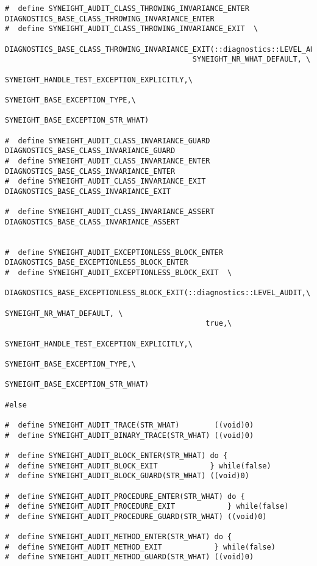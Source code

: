 \begin{verbatim}
#  define SYNEIGHT_AUDIT_CLASS_THROWING_INVARIANCE_ENTER DIAGNOSTICS_BASE_CLASS_THROWING_INVARIANCE_ENTER
#  define SYNEIGHT_AUDIT_CLASS_THROWING_INVARIANCE_EXIT  \
    DIAGNOSTICS_BASE_CLASS_THROWING_INVARIANCE_EXIT(::diagnostics::LEVEL_AUDIT,\
                                           SYNEIGHT_NR_WHAT_DEFAULT, \
                                           SYNEIGHT_HANDLE_TEST_EXCEPTION_EXPLICITLY,\
                                           SYNEIGHT_BASE_EXCEPTION_TYPE,\
                                           SYNEIGHT_BASE_EXCEPTION_STR_WHAT)

#  define SYNEIGHT_AUDIT_CLASS_INVARIANCE_GUARD DIAGNOSTICS_BASE_CLASS_INVARIANCE_GUARD
#  define SYNEIGHT_AUDIT_CLASS_INVARIANCE_ENTER DIAGNOSTICS_BASE_CLASS_INVARIANCE_ENTER
#  define SYNEIGHT_AUDIT_CLASS_INVARIANCE_EXIT  DIAGNOSTICS_BASE_CLASS_INVARIANCE_EXIT

#  define SYNEIGHT_AUDIT_CLASS_INVARIANCE_ASSERT  DIAGNOSTICS_BASE_CLASS_INVARIANCE_ASSERT


#  define SYNEIGHT_AUDIT_EXCEPTIONLESS_BLOCK_ENTER  DIAGNOSTICS_BASE_EXCEPTIONLESS_BLOCK_ENTER
#  define SYNEIGHT_AUDIT_EXCEPTIONLESS_BLOCK_EXIT  \
    DIAGNOSTICS_BASE_EXCEPTIONLESS_BLOCK_EXIT(::diagnostics::LEVEL_AUDIT,\
                                              SYNEIGHT_NR_WHAT_DEFAULT, \
                                              true,\
                                              SYNEIGHT_HANDLE_TEST_EXCEPTION_EXPLICITLY,\
                                              SYNEIGHT_BASE_EXCEPTION_TYPE,\
                                              SYNEIGHT_BASE_EXCEPTION_STR_WHAT)

#else

#  define SYNEIGHT_AUDIT_TRACE(STR_WHAT)        ((void)0)
#  define SYNEIGHT_AUDIT_BINARY_TRACE(STR_WHAT) ((void)0)

#  define SYNEIGHT_AUDIT_BLOCK_ENTER(STR_WHAT) do {
#  define SYNEIGHT_AUDIT_BLOCK_EXIT            } while(false)
#  define SYNEIGHT_AUDIT_BLOCK_GUARD(STR_WHAT) ((void)0)

#  define SYNEIGHT_AUDIT_PROCEDURE_ENTER(STR_WHAT) do {
#  define SYNEIGHT_AUDIT_PROCEDURE_EXIT            } while(false)
#  define SYNEIGHT_AUDIT_PROCEDURE_GUARD(STR_WHAT) ((void)0)

#  define SYNEIGHT_AUDIT_METHOD_ENTER(STR_WHAT) do {
#  define SYNEIGHT_AUDIT_METHOD_EXIT            } while(false)
#  define SYNEIGHT_AUDIT_METHOD_GUARD(STR_WHAT) ((void)0)


\end{verbatim}
